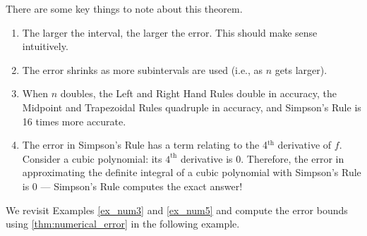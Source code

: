 There are some key things to note about this theorem.
\begin{enumerate}
	\item	The larger the interval, the larger the error. This should make sense intuitively.
	\item	The error shrinks as more subintervals are used (i.e., as $n$ gets larger).
	\item	When $n$ doubles, the Left and Right Hand Rules double in accuracy, the Midpoint and Trapezoidal Rules quadruple in accuracy, and Simpson's Rule is 16 times more accurate.
	\item	The error in Simpson's Rule has a term relating to the 4$^{\text{th}}$ derivative of $f$. Consider a cubic polynomial: its $4^{\text{th}}$ derivative is 0. Therefore, the error in approximating the definite integral of a cubic polynomial with Simpson's Rule is 0 --- Simpson's Rule computes the exact answer!
\end{enumerate}

We revisit Examples \ref{ex_num3} and \ref{ex_num5} and compute the error bounds using \autoref{thm:numerical_error} in the following example.

